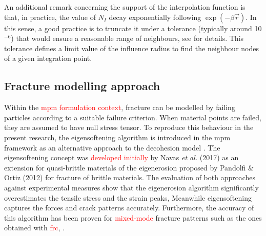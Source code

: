 \documentclass[preprint,12pt,a4paper]{elsarticle}
\begin{document}
An additional remark concerning the support of the interpolation function is that, in practice, the value of $N_I$ decay exponentially following $\exp(-\beta \vec{r})$. In this sense,
a good practice is to truncate it under a tolerance  (typically around 10$^{-6}$) that would ensure a reasonable
range of neighbours, see \cite{Arroyo2006} for details. This tolerance
defines a limit value of the influence radius to find the neighbour
nodes of a given integration point.

\subsection{Fracture modelling approach}
\label{sec:2.3}
Within the \textcolor{red}{\acrshort{mpm} formulation context}, fracture can be
modelled by failing particles according to a suitable failure
criterion. When material points are failed, they are assumed to have
null stress tensor. To reproduce this behaviour in the present
research, the eigensoftening algorithm is introduced in the 
\acrshort{mpm} framework as an alternative approach to the decohesion
model \cite{Schreyer_2002}. The eigensoftening concept
was \textcolor{red}{developed initially} by Navas {\it et al.}
(2017)\cite{Navas_2017_ES} as an extension for quasi-brittle materials
of the eigenerosion proposed by Pandolfi \& Ortiz
(2012)\cite{Pandolfi_2012} for fracture of brittle materials. The
  evaluation of both approaches \cite{Navas_2017_ES} against
  experimental measures show that the eigenerosion algorithm significantly overestimates the tensile stress and the strain peaks, Meanwhile eigensoftening captures the forces and crack
patterns accurately. Furthermore, the accuracy of this algorithm has been proven for \textcolor{red}{mixed-mode} fracture patterns such as the ones obtained with \textcolor{red}{\acrfull{frc}}, \cite{Navas_2018_ES}.\\
\end{document}
